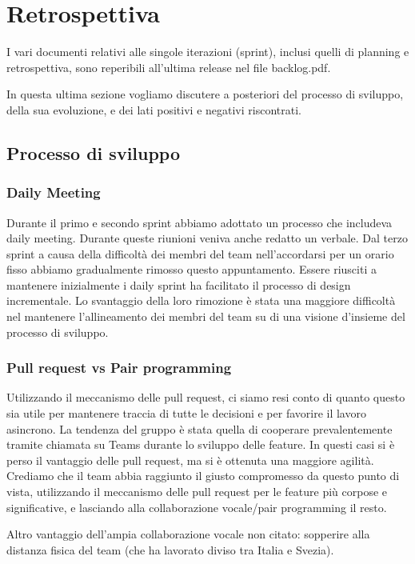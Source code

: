 \newpage
\section{Retrospettiva}
I vari documenti relativi alle singole iterazioni (sprint), inclusi quelli di planning e retrospettiva, sono reperibili all'ultima release nel file backlog.pdf.


In questa ultima sezione vogliamo discutere a posteriori del processo di sviluppo, della sua evoluzione, e dei lati positivi e negativi riscontrati.

\subsection{Processo di sviluppo}
\subsubsection{Daily Meeting}
Durante il primo e secondo sprint abbiamo adottato un processo che includeva daily meeting. Durante queste riunioni veniva anche redatto un verbale. Dal terzo sprint a causa della difficoltà dei membri del team nell'accordarsi per un orario fisso abbiamo gradualmente rimosso questo appuntamento. Essere riusciti a mantenere inizialmente i daily sprint ha facilitato il processo di design incrementale. Lo svantaggio della loro rimozione è stata una maggiore difficoltà nel mantenere l'allineamento dei membri del team su di una visione d'insieme del processo di sviluppo.

\subsubsection{Pull request vs Pair programming}
Utilizzando il meccanismo delle pull request, ci siamo resi conto di quanto questo sia utile per mantenere traccia di tutte le decisioni e per favorire il lavoro asincrono.
La tendenza del gruppo è stata quella di cooperare prevalentemente tramite chiamata su Teams durante lo sviluppo delle feature. In questi casi si è perso il vantaggio delle pull request, ma si è ottenuta una maggiore agilità.
Crediamo che il team abbia raggiunto il giusto compromesso da questo punto di vista, utilizzando il meccanismo delle pull request per le feature più corpose e significative, e lasciando alla collaborazione vocale/pair programming il resto.

Altro vantaggio dell'ampia collaborazione vocale non citato: sopperire alla distanza fisica del team (che ha lavorato diviso tra Italia e Svezia).

